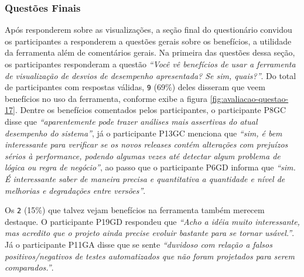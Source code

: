 \subsubsection{Questões Finais}

Após responderem sobre as visualizações, a seção final do questionário convidou os participantes a responderem a questões gerais sobre os benefícios, a utilidade da ferramenta além de comentários gerais. Na primeira das questões dessa seção, os participantes responderam a questão \textit{``Você vê benefícios de usar a ferramenta de visualização de desvios de desempenho apresentada? Se sim, quais?''}. Do total de participantes com respostas válidas, \texttt{9} (69\%) deles disseram que veem benefícios no uso da ferramenta, conforme exibe a figura \ref{fig:avaliacao-questao-17}. Dentre os benefícios comentados pelos participantes, o participante P8GC disse que \textit{``aparentemente pode trazer análises mais assertivas do atual desempenho do sistema''}, já o participante P13GC menciona que \textit{``sim, é bem interessante para verificar se os novos releases contém alterações com prejuízos sérios à performance, podendo algumas vezes até detectar algum problema de lógica ou regra de negócio''}, ao passo que o participante P6GD informa que \textit{``sim. É interessante saber de maneira precisa e quantitativa a quantidade e nível de melhorias e degradações entre versões''}.

Os \texttt{2} (15\%) que talvez vejam benefícios na ferramenta também merecem destaque. O participante P19GD respondeu que \textit{``Acho a idéia muito interessante, mas acredito que o projeto ainda precise evoluir bastante para se tornar usável.''}. Já o participante P11GA disse que se sente \textit{``duvidoso com relação a falsos positivos/negativos de testes automatizados que não foram projetados para serem comparados.''}.

